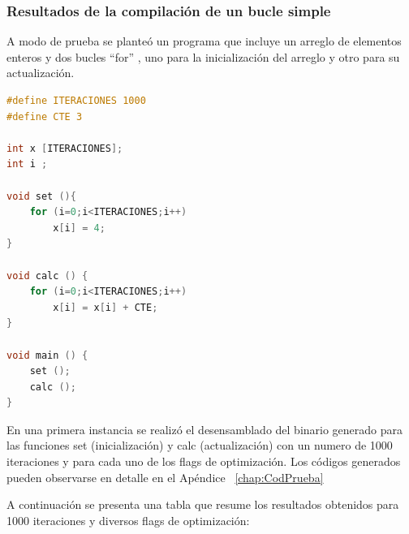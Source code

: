 		\subsubsection{Resultados de la compilación de un bucle simple}

A modo de prueba se planteó un programa que incluye un arreglo de elementos enteros y dos bucles ``for'' , uno para la inicialización del arreglo y
otro para su actualización.

	\begin{lstlisting}[language=C,frame=single , caption={Código del programa de prueba de opciones de optimización del compilador (bucle simple) }]
#define ITERACIONES 1000
#define CTE 3

int x [ITERACIONES];
int i ;

void set (){
	for (i=0;i<ITERACIONES;i++)
		x[i] = 4;
}

void calc () {
	for (i=0;i<ITERACIONES;i++)
		x[i] = x[i] + CTE;
}

void main () {
	set ();
	calc ();
}
	\end{lstlisting}
		
En una primera instancia se realizó el desensamblado del binario generado para las funciones set (inicialización) y calc (actualización) con un
numero de 1000 iteraciones y para cada uno de los flags de optimización. Los códigos generados pueden observarse en detalle en el Apéndice
~\ref{chap:CodPrueba} 

A continuación se presenta una tabla que resume los resultados obtenidos para 1000 iteraciones y diversos flags de optimización:

